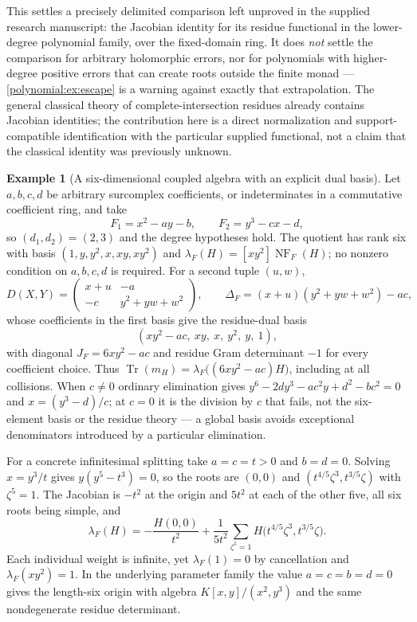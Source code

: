 \documentclass[11pt,letterpaper]{article}
\numberwithin{equation}{section}
\theoremstyle{definition}
\newtheorem{example}[theorem]{Example}
\theoremstyle{remark}\newtheorem{remark}[theorem]{Remark}
\newcommand{\Tr}{\operatorname{Tr}}
\newcommand{\NF}{\operatorname{NF}}
\begin{document}
This settles a precisely delimited comparison left unproved in the supplied
research manuscript: the Jacobian identity for its residue functional in the
lower-degree polynomial family, over the fixed-domain ring. It does
\emph{not} settle the comparison for arbitrary holomorphic errors, nor for
polynomials with higher-degree positive errors that can create roots outside
the finite monad --- \cref{polynomial:ex:escape} is a warning against exactly
that extrapolation. The general classical theory of complete-intersection
residues already contains Jacobian identities; the contribution here is a
direct normalization and support-compatible identification with the particular
supplied functional, not a claim that the classical identity was previously
unknown.

\begin{example}[A six-dimensional coupled algebra with an explicit dual basis]
\label{polynomial:ex:sixpoint}
Let $a,b,c,d$ be arbitrary surcomplex coefficients, or indeterminates in a
commutative coefficient ring, and take
\begin{equation}\label{polynomial:eq:sixsystem}
 F_1=x^2-ay-b,\qquad F_2=y^3-cx-d,
\end{equation}
so $(d_1,d_2)=(2,3)$ and the degree hypotheses hold. The quotient has rank six
with basis $(1,y,y^2,x,xy,xy^2)$ and $\lambda_F(H)=[xy^2]\NF_F(H)$; no nonzero
condition on $a,b,c,d$ is required. For a second tuple $(u,w)$,
\[
 D(X,Y)=\begin{pmatrix}x+u&-a\\-c&y^2+yw+w^2\end{pmatrix},
 \qquad \Delta_F=(x+u)(y^2+yw+w^2)-ac,
\]
whose coefficients in the first basis give the residue-dual basis
\begin{equation}\label{polynomial:eq:sixdual}
 (xy^2-ac,\ xy,\ x,\ y^2,\ y,\ 1),
\end{equation}
with diagonal $J_F=6xy^2-ac$ and residue Gram determinant $-1$ for every
coefficient choice. Thus $\Tr(m_H)=\lambda_F\bigl((6xy^2-ac)H\bigr)$,
including at all collisions. When $c\ne0$ ordinary elimination gives
$y^6-2dy^3-ac^2y+d^2-bc^2=0$ and $x=(y^3-d)/c$; at $c=0$ it is the division by
$c$ that fails, not the six-element basis or the residue theory --- a global
basis avoids exceptional denominators introduced by a particular elimination.

For a concrete infinitesimal splitting take $a=c=t>0$ and $b=d=0$. Solving
$x=y^3/t$ gives $y(y^5-t^3)=0$, so the roots are $(0,0)$ and
$(t^{4/5}\zeta^3,t^{3/5}\zeta)$ with $\zeta^5=1$. The Jacobian is $-t^2$ at
the origin and $5t^2$ at each of the other five, all six roots being simple,
and
\begin{equation}\label{polynomial:eq:sixweights}
 \lambda_F(H)=-\frac{H(0,0)}{t^2}
 +\frac1{5t^2}\sum_{\zeta^5=1}H\bigl(t^{4/5}\zeta^3,t^{3/5}\zeta\bigr).
\end{equation}
Each individual weight is infinite, yet $\lambda_F(1)=0$ by cancellation and
$\lambda_F(xy^2)=1$. In the underlying parameter family the value $a=c=b=d=0$
gives the length-six origin with algebra $K[x,y]/(x^2,y^3)$ and the same
nondegenerate residue determinant.
\end{example}
\end{document}
